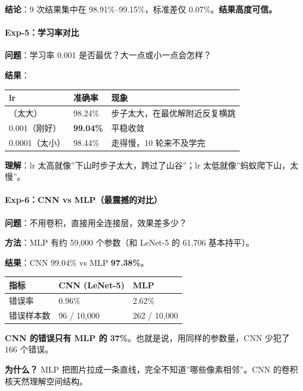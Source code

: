 \documentclass[
  11pt,
]{ctexart}
\newcounter{none} %
\begin{document}
\textbf{结论}：9 次结果集中在 98.91\%–99.15\%，标准差仅
0.07\%。\textbf{结果高度可信。}

\paragraph{Exp-5：学习率对比}\label{exp-5ux5b66ux4e60ux7387ux5bf9ux6bd4}

\textbf{问题}：学习率 0.001 是否最优？大一点或小一点会怎样？

\textbf{结果}：

{\def\LTcaptype{none} %
\begin{longtable}[]{@{}lll@{}}
\toprule\noalign{}
lr & 准确率 & 现象 \\
\midrule\noalign{}
\endhead
\bottomrule\noalign{}
\endlastfoot
0.01（太大） & 98.24\% & 步子太大，在最优解附近反复横跳 \\
0.001（刚好） & \textbf{99.04\%} & 平稳收敛 \\
0.0001（太小） & 98.44\% & 走得慢，10 轮来不及学完 \\
\end{longtable}
}

\textbf{理解}：lr 太高就像”下山时步子太大，跨过了山谷”；lr
太低就像”蚂蚁爬下山，太慢”。

\paragraph{Exp-6：CNN vs
MLP（最震撼的对比）}\label{exp-6cnn-vs-mlpux6700ux9707ux64bcux7684ux5bf9ux6bd4}

\textbf{问题}：不用卷积，直接用全连接层，效果差多少？

\textbf{方法}：MLP 有约 59,000 个参数（和 LeNet-5 的 61,706 基本持平）。

\textbf{结果}：CNN 99.04\% vs MLP \textbf{97.38\%}。

{\def\LTcaptype{none} %
\begin{longtable}[]{@{}lll@{}}
\toprule\noalign{}
指标 & CNN (LeNet-5) & MLP \\
\midrule\noalign{}
\endhead
\bottomrule\noalign{}
\endlastfoot
错误率 & 0.96\% & 2.62\% \\
错误样本数 & 96 / 10,000 & 262 / 10,000 \\
\end{longtable}
}

\textbf{CNN 的错误只有 MLP 的 37\%}。也就是说，用同样的参数量，CNN
少犯了 166 个错误。

\textbf{为什么？} MLP 把图片拉成一条直线，完全不知道”哪些像素相邻”。CNN
的卷积核天然理解空间结构。
\end{document}
